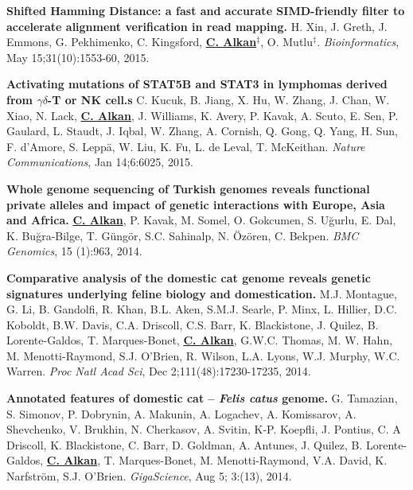 \documentclass[margin,line]{res}
\begin{document}
\begin{resume}
  \vspace{-.2cm}        
  {\bf Shifted Hamming Distance: a fast and accurate SIMD-friendly filter to accelerate alignment verification in read mapping.} H. Xin, J. Greth, J. Emmons, 
G. Pekhimenko, C. Kingsford, {\bf {\underline{C. Alkan}}}$^\ddag$,  O. Mutlu$^\ddag$. {\em Bioinformatics},  May 15;31(10):1553-60, 2015.

  \vspace{-.2cm}        
  {\bf Activating mutations of STAT5B and STAT3 in lymphomas derived from $\gamma\delta$-T or NK cell.s}
   C. Kucuk, B. Jiang, X. Hu, W. Zhang, J. Chan, W. Xiao, N. Lack,   {\bf {\underline {C. Alkan}}},  J. Williams, K. Avery, P. Kavak, A. Scuto, E. Sen,  P. Gaulard, L. Staudt, J. Iqbal,  W. Zhang,  A. Cornish, Q. Gong, Q.  Yang, H. Sun, F. d'Amore, S. Leppä, W. Liu, K. Fu, L. de Leval, T. McKeithan.
 {\em Nature Communications}, Jan 14;6:6025, 2015.


  \vspace{-.2cm}        
  {\bf Whole genome sequencing of Turkish genomes reveals functional private alleles and impact of genetic interactions with Europe, Asia and Africa.}
  {\bf {\underline {C. Alkan}}}, P. Kavak, M. Somel, O. Gokcumen, S. Uğurlu, E. Dal, K. Buğra-Bilge,  T. Güngör, S.C. Sahinalp, N. Özören, C. Bekpen.
  {\em BMC Genomics}, 15 (1):963, 2014.

  \vspace{-.2cm}        
  {\bf Comparative analysis of the domestic cat genome reveals genetic signatures underlying feline biology and domestication.}
  M.J. Montague, G. Li, B. Gandolfi, R. Khan, B.L. Aken, S.M.J. Searle, P. Minx, L. Hillier, D.C. Koboldt, B.W. Davis, C.A. Driscoll, 
  C.S. Barr, K. Blackistone, J. Quilez, B. Lorente-Galdos, T. Marques-Bonet, {\bf {\underline {C. Alkan}}}, G.W.C. Thomas, M. W. Hahn, M. Menotti-Raymond, 
  S.J. O’Brien, R. Wilson, L.A. Lyons, W.J. Murphy, W.C. Warren. {\em Proc Natl Acad Sci}, Dec 2;111(48):17230-17235, 2014.

                                       
  \vspace{-.2cm}        
  {\bf Annotated features of domestic cat – \textit{Felis catus} genome.}
  G. Tamazian, S. Simonov, P. Dobrynin, A. Makunin, A. Logachev, 
  A. Komissarov, A. Shevchenko, V. Brukhin, N. Cherkasov, A. Svitin,
  K-P. Koepfli, J. Pontius, C. A Driscoll, K. Blackistone, C. Barr, 
  D. Goldman, A. Antunes, J. Quilez, B. Lorente-Galdos,  {\bf {\underline {C. Alkan}}},
  T. Marques-Bonet, M. Menotti-Raymond, V.A. David, K. Narfström, S.J. O’Brien.
  {\em GigaScience}, Aug 5; 3:(13), 2014.
                                       

\end{resume}
\end{document}
